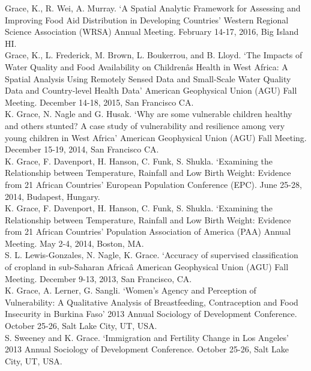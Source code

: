 \documentclass[11pt]{article} %
\begin{document}
\noindent
Grace, K., R. Wei, A. Murray. `A Spatial Analytic Framework for Assessing and Improving Food Aid Distribution in Developing Countries' Western Regional Science Association (WRSA) Annual Meeting. February 14-17, 2016, Big Island HI.\\

\noindent
Grace, K., L. Frederick, M. Brown, L. Boukerrou, and B. Lloyd. `The Impacts of Water Quality and Food Availability on Childrenâs Health in West Africa: A Spatial Analysis Using Remotely Sensed Data and Small-Scale Water Quality Data and Country-level Health Data' American Geophysical Union (AGU) Fall Meeting.  December 14-18, 2015, San Francisco CA.\\

\noindent
K. Grace, N. Nagle and G. Husak. `Why are some vulnerable children healthy and others stunted? A case study of vulnerability and resilience among very young children in West Africa' American Geophysical Union (AGU) Fall Meeting.  December 15-19, 2014, San Francisco CA.\\

\noindent
K. Grace, F. Davenport, H. Hanson, C. Funk, S. Shukla. `Examining the Relationship between Temperature, Rainfall and Low Birth Weight: Evidence from 21 African Countries' European Population Conference (EPC).  June 25-28, 2014, Budapest, Hungary. \\

\noindent
K. Grace, F. Davenport, H. Hanson, C. Funk, S. Shukla. `Examining the Relationship between Temperature, Rainfall and Low Birth Weight: Evidence from 21 African Countries' Population Association of America (PAA) Annual Meeting.  May 2-4, 2014, Boston, MA. \\

\noindent
S. L. Lewis-Gonzales, N. Nagle, K. Grace. `Accuracy of supervised classification of cropland in sub-Saharan Africaâ  American Geophysical Union (AGU) Fall Meeting. December 9-13, 2013, San Francisco, CA.\\

\noindent
K. Grace, A. Lerner, G. Sangli. `Women's Agency and Perception of Vulnerability: A Qualitative Analysis of Breastfeeding, Contraception and Food Insecurity in Burkina Faso' 2013 Annual Sociology of Development Conference. October 25-26, Salt Lake City, UT, USA.\\

\noindent
S. Sweeney and K. Grace. `Immigration and Fertility Change in Los Angeles' 2013 Annual Sociology of Development Conference. October 25-26, Salt Lake City, UT, USA.\\
\end{document}
